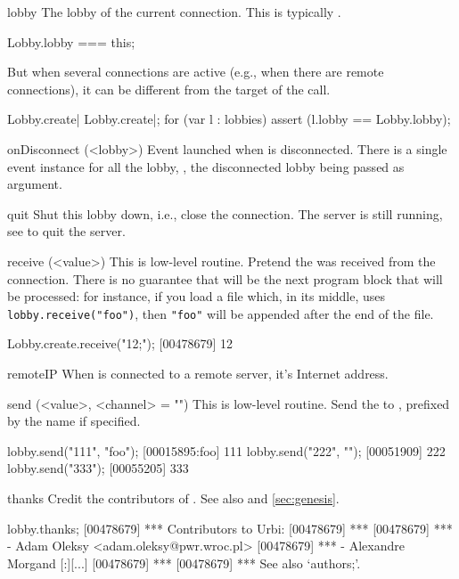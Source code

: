 \begin{urbiscriptapi}
\item[lobby]
  The lobby of the current connection.  This is typically \this.
\begin{urbiassert}
Lobby.lobby === this;
\end{urbiassert}

  But when several connections are active (e.g., when there are remote
  connections), it can be different from the target of the call.

\begin{urbiscript}
Lobby.create| Lobby.create|;
for (var l : lobbies)
  assert (l.lobby == Lobby.lobby);
\end{urbiscript}


\item[onDisconnect](<lobby>)%
  Event launched when \this is disconnected.  There is a single event
  instance for all the lobby, , the
  disconnected lobby being passed as argument.


\item[quit] Shut this lobby down, i.e., close the connection.  The
  server is still running, see  to quit the
  server.


\item[receive](<value>)%
  This is low-level routine.  Pretend the 
   was received from the connection.  There is no guarantee
  that  will be the next program block that will be
  processed: for instance, if you load a file which, in its middle,
  uses \lstinline|lobby.receive("foo")|, then \lstinline|"foo"| will
  be appended after the end of the file.
\begin{urbiscript}
Lobby.create.receive("12;");
[00478679] 12
\end{urbiscript}


\item[remoteIP]
  When \this is connected to a remote server, it's Internet address.


\item[send](<value>, <channel> = "")%
  This is low-level routine.  Send the  
  to \this, prefixed by the 
   name if specified.
\begin{urbiscript}
lobby.send("111", "foo");
[00015895:foo] 111
lobby.send("222", "");
[00051909] 222
lobby.send("333");
[00055205] 333
\end{urbiscript}


\item[thanks] Credit the contributors of \usdk.  See also 
  and \autoref{sec:genesis}.
\begin{urbiscript}
lobby.thanks;
[00478679] *** Contributors to Urbi:
[00478679] ***
[00478679] ***  - Adam Oleksy <adam.oleksy@pwr.wroc.pl>
[00478679] ***  - Alexandre Morgand
[:][...]
[00478679] ***
[00478679] *** See also `authors;'.
\end{urbiscript}


\end{urbiscriptapi}
